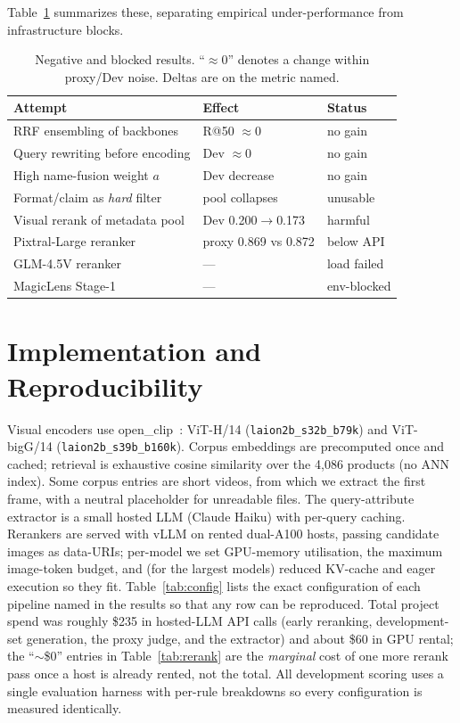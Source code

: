 \documentclass[sigconf,nonacm]{acmart}
\begin{document}
Table~\ref{tab:negatives} summarizes these, separating empirical
under-performance from infrastructure blocks.

\begin{table}[t]
\centering\small
\caption{Negative and blocked results. ``$\approx$0'' denotes a change within
proxy/Dev noise. Deltas are on the metric named.}
\label{tab:negatives}
\begin{tabular}{@{}p{3.5cm}p{2.6cm}p{1.4cm}@{}}
\toprule
Attempt & Effect & Status \\
\midrule
RRF ensembling of backbones & R@50 $\approx$0 & no gain \\
Query rewriting before encoding & Dev $\approx$0 & no gain \\
High name-fusion weight $a$ & Dev decrease & no gain \\
Format/claim as \emph{hard} filter & pool collapses & unusable \\
Visual rerank of metadata pool & Dev 0.200$\to$0.173 & harmful \\
Pixtral-Large reranker & proxy 0.869 vs 0.872 & below API \\
GLM-4.5V reranker & — & load failed \\
MagicLens Stage-1 & — & env-blocked \\
\bottomrule
\end{tabular}
\end{table}

\section{Implementation and Reproducibility}
\label{sec:impl}
Visual encoders use open\_clip~\cite{openclip}: ViT-H/14
(\texttt{laion2b\_s32b\_b79k}) and ViT-bigG/14 (\texttt{laion2b\_s39b\_b160k}).
Corpus embeddings are precomputed once and cached; retrieval is exhaustive
cosine similarity over the 4{,}086 products (no ANN index). Some corpus
entries are short videos, from which we extract the first frame, with a
neutral placeholder for unreadable files. The query-attribute extractor is a
small hosted LLM (Claude Haiku) with per-query caching. Rerankers are served
with vLLM on rented dual-A100 hosts, passing candidate images as data-URIs;
per-model we set GPU-memory utilisation, the maximum image-token budget, and
(for the largest models) reduced KV-cache and eager execution so they fit.
Table~\ref{tab:config} lists the exact configuration of each pipeline named
in the results so that any row can be reproduced. Total project spend was
roughly \$235 in hosted-LLM API calls (early reranking, development-set
generation, the proxy judge, and the extractor) and about \$60 in GPU rental;
the ``$\sim$\$0'' entries in Table~\ref{tab:rerank} are the \emph{marginal}
cost of one more rerank pass once a host is already rented, not the total.
All development scoring uses a single evaluation harness with per-rule
breakdowns so every configuration is measured identically.
\end{document}
